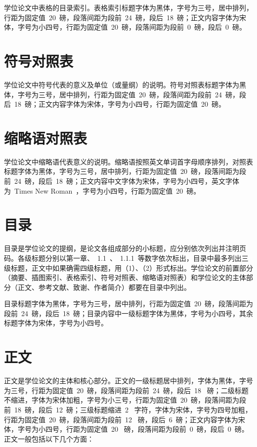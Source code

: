 学位论文中表格的目录索引。表格索引标题字体为黑体，字号为三号，居中排列，行距为固定值~20~磅，段落间距为段前~24~磅，段后~18~磅；正文内容字体为宋体，字号为小四号，行距为固定值~20~磅，段落间距为段前~0~磅，段后~0~磅。

\section{符号对照表}

学位论文中符号代表的意义及单位（或量纲）的说明。符号对照表标题字体为黑体，字号为三号，居中排列，行距为固定值~20~磅，段落间距为段前~24~磅，段后~18~磅；正文内容字体为宋体，字号为小四号，行距为固定值~20~磅。

\section{缩略语对照表}

学位论文中缩略语代表意义的说明。缩略语按照英文单词首字母顺序排列，对照表标题字体为黑体，字号为三号，居中排列，行距为固定值~20~磅，段落间距为段前~24~磅，段后~18~磅；正文内容中文字体为宋体，字号为小四号，英文字体为~Times New Roman~，字号为小四号，行距为固定值~20~磅。

\section{目录}

目录是学位论文的提纲，是论文各组成部分的小标题，应分别依次列出并注明页码。各级标题分别以第一章、~1.1~、~1.1.1~等数字依次标出，目录中最多列出三级标题，正文中如果确需四级标题，用（1）、（2）形式标出。学位论文的前置部分（摘要、插图索引、表格索引、符号对照表、缩略语对照表）和学位论文的主体部分（正文、参考文献、致谢、作者简介）都要在目录中列出。

目录标题字体为黑体，字号为三号，居中排列，行距为固定值~20~磅，段落间距为段前~24~磅，段后~18~磅；目录内容中一级标题字体为黑体，字号为小四号，其余标题字体为宋体，字号为小四号。

\section{正文}

正文是学位论文的主体和核心部分。正文的一级标题居中排列，字体为黑体，字号为三号，行距为固定值~20~磅，段落间距为段前~24~磅，段后~18~ 磅；二级标题不缩进，字体为宋体加粗，字号为小三号，行距为固定值~20~磅，段落间距为段前~18~磅，段后~12~磅；三级标题缩进~2~ 字符，字体为宋体，字号为四号加粗，行距为固定值~20~磅，段落间距为段前~12~ 磅，段后~6~磅；正文内容字体为宋体，字号为小四号，行距为固定值~20~ 磅，段落间距为段前~0~磅，段后~0~磅。正文一般包括以下几个方面：

